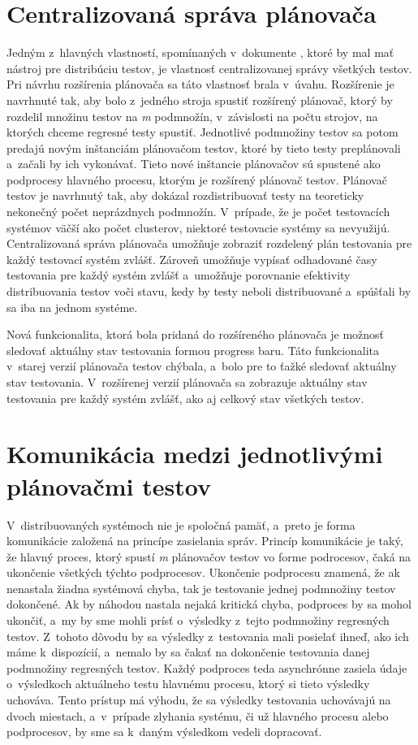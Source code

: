 \section{Centralizovaná správa plánovača}
\label{sekcia:centralizovana_sprava}
Jedným z~hlavných vlastností, spomínaných v~dokumente \cite{Parallel_approach}, ktoré by mal mať nástroj pre distribúciu testov,
je vlastnosť centralizovanej správy všetkých testov. 
Pri návrhu rozšírenia plánovača sa táto vlastnosť brala v~úvahu. 
Rozšírenie je navrhnuté tak, aby bolo z~jedného stroja spustiť rozšírený plánovač, ktorý by rozdelil množinu testov na \emph{m} 
podmnožín, v~závislosti na počtu strojov, na ktorých chceme regresné testy spustiť. Jednotlivé podmnožiny testov sa 
potom predajú novým inštanciám plánovačom testov, ktoré by tieto testy preplánovali a~začali by ich vykonávať. 
Tieto nové inštancie plánovačov sú spustené ako podprocesy hlavného procesu, ktorým je rozšírený plánovač testov.
Plánovač testov je navrhnutý tak, aby dokázal rozdistribuovať testy na teoreticky nekonečný počet neprázdnych podmnožín.
V~prípade, že je počet testovacích systémov väčší ako počet clusterov, niektoré testovacie systémy sa nevyužijú.
Centralizovaná správa plánovača umožňuje zobraziť rozdelený plán testovania pre každý testovací systém zvlášť.
Zároveň umožňuje vypísať odhadované časy testovania pre každý systém zvlášť a~umožňuje porovnanie efektivity distribuovania testov voči stavu,
kedy by testy neboli distribuované a~spúšťali by sa iba na jednom systéme. 

Nová funkcionalita, ktorá bola pridaná do rozšíreného plánovača je možnosť sledovať aktuálny stav testovania
formou progress baru. Táto funkcionalita v~starej verzií plánovača testov chýbala, a~bolo pre to ťažké sledovať aktuálny
stav testovania. V~rozšírenej verzií plánovača sa zobrazuje aktuálny stav testovania pre každý systém zvlášť, ako aj
celkový stav všetkých testov.

\section{Komunikácia medzi jednotlivými plánovačmi testov}
\label{sekcia:komunikacia}
V~distribuovaných systémoch nie je spoločná pamäť, a~preto je forma komunikácie založená na princípe zasielania správ.
Princíp komunikácie je taký, že hlavný proces, ktorý spustí \emph{m} plánovačov testov vo forme podrocesov, čaká na ukončenie
všetkých týchto podprocesov. Ukončenie podprocesu znamená, že ak nenastala žiadna systémová chyba, tak je testovanie jednej
podmnožiny testov dokončené. Ak by náhodou nastala nejaká kritická chyba, podproces by sa mohol ukončiť, a~my by sme mohli prísť
o~výsledky z~tejto podmnožiny regresných testov. Z~tohoto dôvodu by sa výsledky z~testovania mali posielať ihneď, ako ich máme k~dispozícií,
a~nemalo by sa čakať na dokončenie testovania danej podmnožiny regresných testov. Každý podproces teda asynchrónne zasiela údaje o~výsledkoch
aktuálneho testu hlavnému procesu, ktorý si tieto výsledky uchováva. Tento prístup má výhodu, že sa výsledky testovania uchovávajú na dvoch miestach,
a~v~prípade zlyhania systému, či už hlavného procesu alebo podprocesov, by sme sa k~daným výsledkom vedeli dopracovať. 


